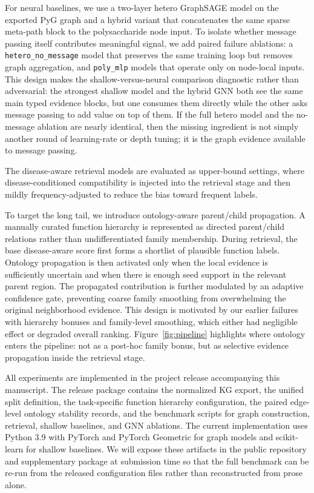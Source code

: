\documentclass[11pt]{article}
\begin{document}
For neural baselines, we use a two-layer hetero GraphSAGE model on the exported PyG graph and a hybrid variant that concatenates the same sparse meta-path block to the polysaccharide node input. To isolate whether message passing itself contributes meaningful signal, we add paired failure ablations: a \texttt{hetero\_no\_message} model that preserves the same training loop but removes graph aggregation, and \texttt{poly\_mlp} models that operate only on node-local inputs. This design makes the shallow-versus-neural comparison diagnostic rather than adversarial: the strongest shallow model and the hybrid GNN both see the same main typed evidence blocks, but one consumes them directly while the other asks message passing to add value on top of them. If the full hetero model and the no-message ablation are nearly identical, then the missing ingredient is not simply another round of learning-rate or depth tuning; it is the graph evidence available to message passing.

The disease-aware retrieval models are evaluated as upper-bound settings, where disease-conditioned compatibility is injected into the retrieval stage and then mildly frequency-adjusted to reduce the bias toward frequent labels.

To target the long tail, we introduce ontology-aware parent/child propagation. A manually curated function hierarchy is represented as directed parent/child relations rather than undifferentiated family membership. During retrieval, the base disease-aware score first forms a shortlist of plausible function labels. Ontology propagation is then activated only when the local evidence is sufficiently uncertain and when there is enough seed support in the relevant parent region. The propagated contribution is further modulated by an adaptive confidence gate, preventing coarse family smoothing from overwhelming the original neighborhood evidence. This design is motivated by our earlier failures with hierarchy bonuses and family-level smoothing, which either had negligible effect or degraded overall ranking. Figure~\ref{fig:pipeline} highlights where ontology enters the pipeline: not as a post-hoc family bonus, but as selective evidence propagation inside the retrieval stage.

All experiments are implemented in the project release accompanying this manuscript. The release package contains the normalized KG export, the unified split definition, the task-specific function hierarchy configuration, the paired edge-level ontology stability records, and the benchmark scripts for graph construction, retrieval, shallow baselines, and GNN ablations. The current implementation uses Python 3.9 with PyTorch and PyTorch Geometric for graph models and scikit-learn for shallow baselines. We will expose these artifacts in the public repository and supplementary package at submission time so that the full benchmark can be re-run from the released configuration files rather than reconstructed from prose alone.
\end{document}

